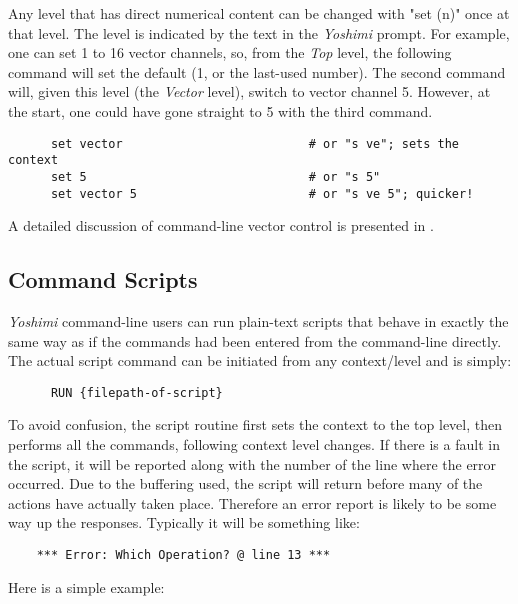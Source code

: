    Any level that has direct numerical content can be changed with
   "set (n)" once at that level.  The level is
   indicated by the text in the \textsl{Yoshimi} prompt.
   For example, one can set 1 to 16 vector channels, so, from the
   \textsl{Top} level, the following command
   will set the default (1, or the last-used number).
   The second command will, given this level (the \textsl{Vector} level),
   switch to vector channel 5.
   However, at the start, one could have gone straight to 5 with the third
   command.

   \begin{verbatim}
      set vector                          # or "s ve"; sets the context
      set 5                               # or "s 5"
      set vector 5                        # or "s ve 5"; quicker!
   \end{verbatim}

   A detailed discussion of command-line vector control is presented in
   .

\subsection{Command Scripts}
\label{subsec:command_line_command_scripts}

   \textsl{Yoshimi} command-line users can run plain-text scripts that behave
   in exactly the same way as if the commands had been entered from the
   command-line directly.
   The actual script command can be initiated from any context/level
   and is simply:

   \begin{verbatim}
      RUN {filepath-of-script}
   \end{verbatim}

   To avoid confusion, the script routine first sets the context to the
   top level, then performs all the commands, following context level changes.
   If there is a fault in the script, it will be reported along with the
   number of the line where the error occurred. Due to the buffering used, the
   script will return before many of the actions have actually taken place.
   Therefore an error report is likely to be some way up the responses.
   Typically it will be something like:

   \begin{verbatim}
    *** Error: Which Operation? @ line 13 ***
   \end{verbatim}

   Here is a simple example:

